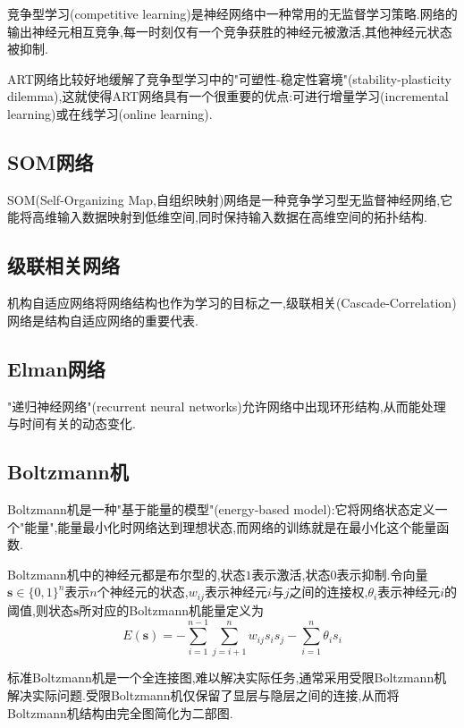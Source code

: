 竞争型学习(competitive learning)是神经网络中一种常用的无监督学习策略.网络的输出神经元相互竞争,每一时刻仅有一个竞争获胜的神经元被激活,其他神经元状态被抑制.

ART网络比较好地缓解了竞争型学习中的"可塑性-稳定性窘境"(stability-plasticity dilemma),这就使得ART网络具有一个很重要的优点:可进行增量学习(incremental learning)或在线学习(online learning).

\subsection{SOM网络}

SOM(Self-Organizing Map,自组织映射)网络是一种竞争学习型无监督神经网络,它能将高维输入数据映射到低维空间,同时保持输入数据在高维空间的拓扑结构.

\subsection{级联相关网络}

机构自适应网络将网络结构也作为学习的目标之一,级联相关(Cascade-Correlation)网络是结构自适应网络的重要代表.

\subsection{Elman网络}

"递归神经网络"(recurrent neural networks)允许网络中出现环形结构,从而能处理与时间有关的动态变化.

\subsection{Boltzmann机}

Boltzmann机是一种"基于能量的模型"(energy-based model):它将网络状态定义一个"能量",能量最小化时网络达到理想状态,而网络的训练就是在最小化这个能量函数.

Boltzmann机中的神经元都是布尔型的,状态$1$表示激活,状态$0$表示抑制.令向量$\mathbf s\in\{0,1\}^n$表示$n$个神经元的状态,$w_{ij}$表示神经元$i$与$j$之间的连接权,$\theta_i$表示神经元$i$的阈值,则状态$\mathbf s$所对应的Boltzmann机能量定义为
\begin{equation}
E(\mathbf s)=-\sum_{i=1}^{n-1}\sum_{j=i+1}^nw_{ij}s_is_j-\sum_{i=1}^n\theta_is_i\end{equation}

标准Boltzmann机是一个全连接图,难以解决实际任务,通常采用受限Boltzmann机解决实际问题.受限Boltzmann机仅保留了显层与隐层之间的连接,从而将Boltzmann机结构由完全图简化为二部图.

